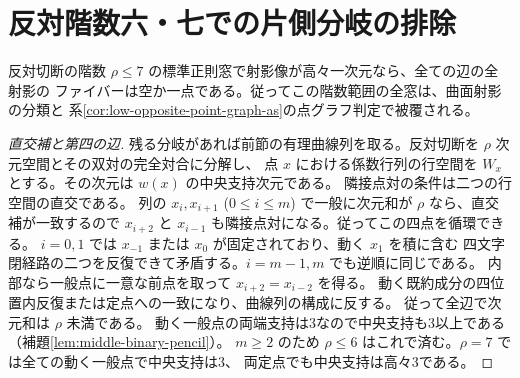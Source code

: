 \section{反対階数六・七での片側分岐の排除}
\label{sec:low-rank-branch-exclusion}
\begin{theorem}\label{thm:low-rank-branch-exclusion}
反対切断の階数 $\rho\le7$ の標準正則窓で射影像が高々一次元なら、全ての辺の全射影の
ファイバーは空か一点である。従ってこの階数範囲の全窓は、曲面射影の分類と
系\ref{cor:low-opposite-point-graph-as}の点グラフ判定で被覆される。
\end{theorem}
\begin{proof}[直交補と第四の辺]
残る分岐があれば前節の有理曲線列を取る。反対切断を $\rho$ 次元空間とその双対の完全対合に分解し、
点 $x$ における係数行列の行空間を $W_x$ とする。その次元は $w(x)$ の中央支持次元である。
隣接点対の条件は二つの行空間の直交である。
列の $x_i,x_{i+1}$ ($0\le i\le m$) で一般に次元和が $\rho$ なら、直交補が一致するので
$x_{i+2}$ と $x_{i-1}$ も隣接点対になる。従ってこの四点を循環できる。
$i=0,1$ では $x_{-1}$ または $x_0$ が固定されており、動く $x_1$ を積に含む
四文字閉経路の二つを反復できて矛盾する。$i=m-1,m$ でも逆順に同じである。
内部なら一般点に一意な前点を取って $x_{i+2}=x_{i-2}$ を得る。
動く既約成分の四位置内反復または定点への一致になり、曲線列の構成に反する。
従って全辺で次元和は $\rho$ 未満である。
動く一般点の両端支持は3なので中央支持も3以上である（補題\ref{lem:middle-binary-pencil}）。
$m\ge2$ のため $\rho\le6$ はこれで済む。$\rho=7$ では全ての動く一般点で中央支持は3、
両定点でも中央支持は高々3である。
\end{proof}


